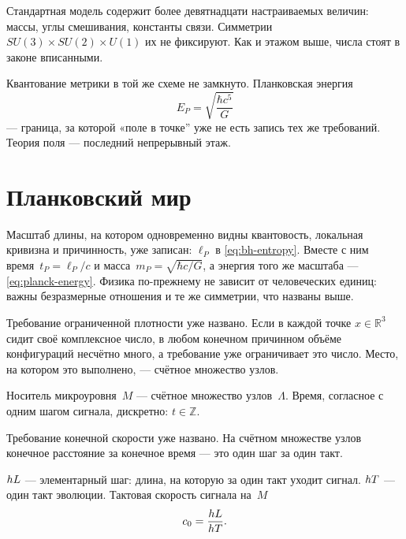 Стандартная модель содержит более девятнадцати настраиваемых величин:
массы, углы смешивания, константы связи.
Симметрии $SU(3)\times SU(2)\times U(1)$ их не фиксируют.
Как и этажом выше, числа стоят в законе вписанными.

Квантование метрики в той же схеме не замкнуто.
Планковская энергия
\begin{equation}
  E_P = \sqrt{\frac{\hbar c^5}{G}}
  \label{eq:planck-energy}
\end{equation}
--- граница, за которой «поле в точке''
уже не есть запись тех же требований.
Теория поля --- последний непрерывный этаж.

\section{Планковский мир}
\label{sec:planck-floor}
\label{ch:carrier-object}
\label{sec:carrier-object}

Масштаб длины, на котором одновременно видны
квантовость, локальная кривизна и причинность, уже записан: $\ell_P$ в \eqref{eq:bh-entropy}.
Вместе с ним время~$t_P=\ell_P/c$ и масса~$m_P=\sqrt{\hbar c/G}$,
а энергия того же масштаба --- \eqref{eq:planck-energy}.
Физика по-прежнему не зависит от человеческих единиц:
важны безразмерные отношения и те же симметрии, что названы выше.

Требование ограниченной плотности уже названо.
Если в каждой точке $x\in\mathbb{R}^3$ сидит своё комплексное число,
в любом конечном причинном объёме конфигураций несчётно много,
а требование уже ограничивает это число.
Место, на котором это выполнено, --- счётное множество узлов.

\begin{definition}
\label{def:carrier-sites}
Носитель микроуровня~$M$ --- счётное множество узлов~$\Lambda$.
Время, согласное с одним шагом сигнала, дискретно: $t\in\mathbb{Z}$.
\end{definition}

Требование конечной скорости уже названо.
На счётном множестве узлов конечное расстояние за конечное время --- это один шаг за один такт.

\begin{definition}
\label{def:step-tick}
$hL$ --- элементарный шаг: длина, на которую за один такт уходит сигнал.
$hT$ --- один такт эволюции.
Тактовая скорость сигнала на~$M$
\[
  c_0 = \frac{hL}{hT}.
\]
\end{definition}

